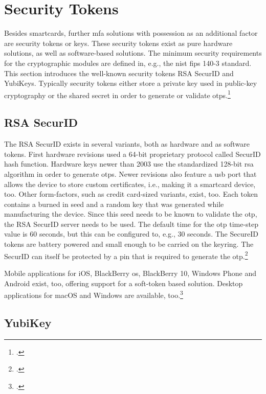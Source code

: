 \section{Security Tokens}

Besides smartcards, further \gls{mfa} solutions with possession as an additional factor are security tokens or keys. These security tokens exist as pure hardware solutions, as well as software-based solutions. The minimum security requirements for the cryptographic modules are defined in, e.g., the \gls{nist} \gls{fips} 140-3 standard. This section introduces the well-known security tokens \frqq RSA SecurID\flqq{} and \frqq YubiKeys\flqq. Typically security tokens either store a private key used in public-key cryptography or the shared secret in order to generate or validate \glspl{otp}.\footcites[See][]{FIPS140-3}[See][Chapter 28.4.3]{1174011}

\subsection{RSA SecurID}

The RSA SecurID exists in several variants, both as hardware and as software tokens. First hardware revisions used a 64-bit proprietary protocol called \frqq SecurID hash function\flqq. Hardware keys newer than 2003 use the standardized 128-bit \gls{rsa} algorithm in order to generate \glspl{otp}. Newer revisions also feature a \gls{usb} port that allows the device to store custom certificates, i.e., making it a smartcard device, too. Other form-factors, such as credit card-sized variants, exist, too. Each token contains a burned in seed and a random key that was generated while manufacturing the device. Since this seed needs to be known to validate the \gls{otp}, the RSA SecurID server needs to be used. The default time for the \gls{otp} time-step value is 60 seconds, but this can be configured to, e.g., 30 seconds. The SecureID tokens are battery powered and small enough to be carried on the keyring. The SecurID can itself be protected by a \gls{pin} that is required to generate the \gls{otp}.\footcites[See][479--480]{eckert-it-sec-9}[See][296]{4351500}

Mobile applications for iOS, BlackBerry \gls{os}, BlackBerry 10, Windows Phone and Android exist, too, offering support for a soft-token based solution. Desktop applications for macOS and Windows are available, too.\footcites[See][3--6]{ibm-mfa}[See][49]{5542954}

\subsection{YubiKey}

